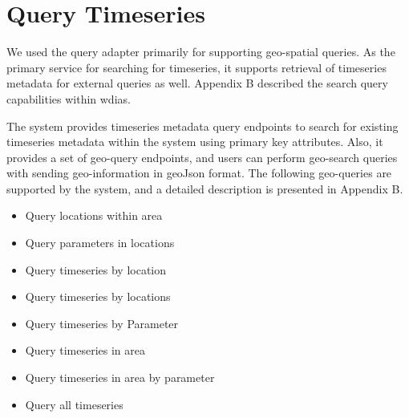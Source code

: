 \section{Query Timeseries}
\label{se:query}

We used the query adapter primarily for supporting geo-spatial queries. As the primary service for searching for timeseries, it supports retrieval of timeseries metadata for external queries as well. Appendix B described the search query capabilities within \acrshort{wdias}.

The system provides timeseries metadata query endpoints to search for existing timeseries metadata within the system using primary key attributes.
Also, it provides a set of geo-query endpoints, and users can perform geo-search queries with sending geo-information in geoJson format. The following geo-queries are supported by the system, and a detailed description is presented in Appendix B.
\begin{itemize}
    \item Query locations within area
    \item Query parameters in locations
    \item Query timeseries by location
    \item Query timeseries by locations
    \item Query timeseries by Parameter
    \item Query timeseries in area
    \item Query timeseries in area by parameter
    \item Query all timeseries
\end{itemize}
